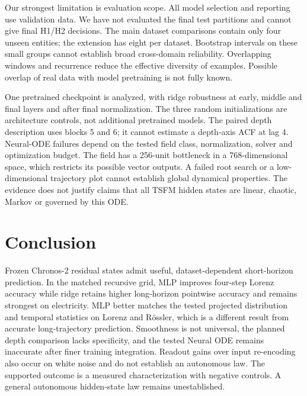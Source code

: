 \documentclass[10pt,a4paper,twocolumn]{article}
\begin{document}
Our strongest limitation is evaluation scope.
All model selection and reporting use validation data.
We have not evaluated the final test partitions and cannot give final H1/H2 decisions.
The main dataset comparisons contain only four unseen entities; the extension has eight per dataset.
Bootstrap intervals on these small groups cannot establish broad cross-domain reliability.
Overlapping windows and recurrence reduce the effective diversity of examples.
Possible overlap of real data with model pretraining is not fully known.

One pretrained checkpoint is analyzed, with ridge robustness at early, middle and final layers and after final normalization.
The three random initializations are architecture controls, not additional pretrained models.
The paired depth description uses blocks 5 and 6; it cannot estimate a depth-axis ACF at lag 4.
Neural-ODE failures depend on the tested field class, normalization, solver and optimization budget.
The field has a 256-unit bottleneck in a 768-dimensional space, which restricts its possible vector outputs.
A failed root search or a low-dimensional trajectory plot cannot establish global dynamical properties.
The evidence does not justify claims that all TSFM hidden states are linear, chaotic, Markov or governed by this ODE.

\section{Conclusion}
Frozen Chronos-2 residual states admit useful, dataset-dependent short-horizon prediction.
In the matched recursive grid, MLP improves four-step Lorenz accuracy while ridge retains higher long-horizon pointwise accuracy and remains strongest on electricity.
MLP better matches the tested projected distribution and temporal statistics on Lorenz and R\"ossler, which is a different result from accurate long-trajectory prediction.
Smoothness is not universal, the planned depth comparison lacks specificity, and the tested Neural ODE remains inaccurate after finer training integration.
Readout gains over input re-encoding also occur on white noise and do not establish an autonomous law.
The supported outcome is a measured characterization with negative controls.
A general autonomous hidden-state law remains unestablished.
\end{document}
